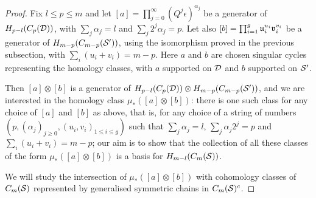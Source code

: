 \begin{proof}
Fix $l\leq p\leq m$ and let $[a]=\prod_{j=0}^{\infty}(Q^j\epsilon)^{\alpha_j}$ be a generator of
$H_{p-l}(C_p(\D))$, with $\sum_j\alpha_j=l$ and $\sum_j2^j\alpha_j=p$. Let also
$[b]=\prod_{i=1}^g \u_i^{u_i}\v_i^{v_i}$ be a generator of $H_{m-p}(C_{m-p}(\S'))$, using the
isomorphism proved in the previous subsection, with $\sum_i(u_i+v_i)=m-p$. Here $a$ and
$b$ are chosen singular cycles representing the homology classes, with $a$ supported on $\D$
and $b$ supported on $\S'$.

Then $[a]\otimes [b]$ is a generator of $H_{p-l}(C_p(\D))\otimes H_{m-p}(C_{m-p}(\S'))$,
and we are interested in the homology class $\mu_*([a]\otimes [b])$: there is one such
class for any choice of $[a]$ and $[b]$ as above, that is, for any choice of a string of numbers
$(p,(\alpha_j)_{j\geq 0},(u_i,v_i)_{1\leq i\leq g})$
such that $\sum_j\alpha_j=l$, $\sum_j\alpha_j2^j=p$ and $\sum_i(u_i+v_i)=m-p$; our aim
is to show that the collection of all these classes of the form $\mu_*([a]\otimes [b])$
is a basis for $H_{m-l}(\cms)$.

We will study
the intersection of $\mu_*([a]\otimes [b])$ with cohomology classes of $\cms$ represented by
generalised symmetric chains in $\cms^c$.




% 


\end{proof}
